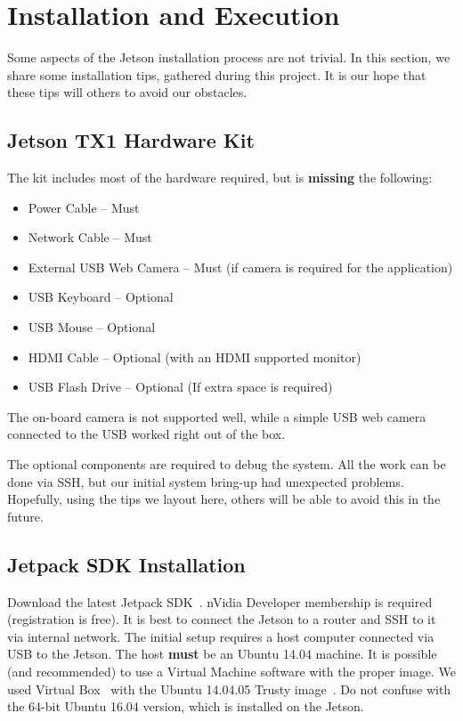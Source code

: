 \section{Installation and Execution}
\label{sec:installation}
Some aspects of the Jetson installation process are not trivial. In this section, we share some installation tips, gathered during this project. It is our hope that these tips will others to avoid our obstacles.

\subsection{Jetson TX1 Hardware Kit}
The kit includes most of the hardware required, but is \textbf{missing} the following:
\begin{itemize}
\setlength\itemsep{0.1em}
\item Power Cable -- Must
\item Network Cable -- Must
\item External USB Web Camera -- Must (if camera is required for the application)
\item USB Keyboard -- Optional
\item USB Mouse -- Optional
\item HDMI Cable -- Optional (with an HDMI supported monitor)
\item USB Flash Drive -- Optional (If extra space is required)
\end{itemize}

The on-board camera is not supported well, while a simple USB web camera connected to the USB worked right out of the box.

The optional components are required to debug the system. All the work can be done via SSH, but our initial system bring-up had unexpected problems. Hopefully, using the tips we layout here, others will be able to avoid this in the future.

\subsection{Jetpack SDK Installation}
Download the latest Jetpack SDK~\cite{jetpackinstall}. nVidia Developer membership is required (registration is free).
It is best to connect the Jetson to a router and SSH to it via internal network. The initial setup requires a host computer connected via USB to the Jetson. The host \textbf{must} be an Ubuntu 14.04 machine. It is possible (and recommended) to use a Virtual Machine software with the proper image. We used Virtual Box~\cite{virtualboxinstall} with the Ubuntu 14.04.05 Trusty image~\cite{virtualboxubuntuimage}. Do not confuse with the 64-bit Ubuntu 16.04 version, which is installed on the Jetson.

